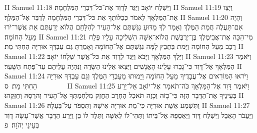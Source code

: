 II Samuel 11:18	וַיִּשְׁלַח יוֹאָב וַיַּגֵּד לְדָוִד אֶת־כּל־דִּבְרֵי הַמִּלְחָמָה׃
II Samuel 11:19	וַיְצַו אֶת־הַמַּלְאָךְ לֵאמֹר כְּכַלּוֹתְךָ אֵת כּל־דִּבְרֵי הַמִּלְחָמָה לְדַבֵּר אֶל־הַמֶּלֶךְ׃
II Samuel 11:20	וְהָיָה אִם־תַּעֲלֶה חֲמַת הַמֶּלֶךְ וְאָמַר לְךָ מַדּוּעַ נִגַּשְׁתֶּם אֶל־הָעִיר לְהִלָּחֵם הֲלוֹא יְדַעְתֶּם אֵת אֲשֶׁר־יֹרוּ מֵעַל הַחוֹמָה׃
II Samuel 11:21	מִי־הִכָּה אֶת־אֲבִימֶלֶךְ בֶּן־יְרֻבֶּשֶׁת הֲלוֹא־אִשָּׁה הִשְׁלִיכָה עָלָיו פֶּלַח רֶכֶב מֵעַל הַחוֹמָה וַיָּמת בְּתֵבֵץ לָמָּה נִגַּשְׁתֶּם אֶל־הַחוֹמָה וְאָמַרְתָּ גַּם עַבְדְּךָ אוּרִיָּה הַחִתִּי מֵת׃
II Samuel 11:22	וַיֵּלֶךְ הַמַּלְאָךְ וַיָּבֹא וַיַּגֵּד לְדָוִד אֵת כּל־אֲשֶׁר שְׁלָחוֹ יוֹאָב׃
II Samuel 11:23	וַיֹּאמֶר הַמַּלְאָךְ אֶל־דָּוִד כִּי־גָבְרוּ עָלֵינוּ הָאֲנָשִׁים וַיֵּצְאוּ אֵלֵינוּ הַשָּׂדֶה וַנִּהְיֶה עֲלֵיהֶם עַד־פֶּתַח הַשָּׁעַר׃
II Samuel 11:24	וַיֹּראוּ הַמּוֹרִאים אֶל־עֲבָדֶיךָ מֵעַל הַחוֹמָה וַיָּמוּתוּ מֵעַבְדֵי הַמֶּלֶךְ וְגַם עַבְדְּךָ אוּרִיָּה הַחִתִּי מֵת׃ {ס}        
II Samuel 11:25	וַיֹּאמֶר דָּוִד אֶל־הַמַּלְאָךְ כֹּה־תֹאמַר אֶל־יוֹאָב אַל־יֵרַע בְּעֵינֶיךָ אֶת־הַדָּבָר הַזֶּה כִּי־כָזֹה וְכָזֶה תֹּאכַל הֶחָרֶב הַחֲזֵק מִלְחַמְתְּךָ אֶל־הָעִיר וְהרְסָהּ וְחַזְּקֵהוּ׃
II Samuel 11:26	וַתִּשְׁמַע אֵשֶׁת אוּרִיָּה כִּי־מֵת אוּרִיָּה אִישָׁהּ וַתִּסְפֹּד עַל־בַּעְלָהּ׃
II Samuel 11:27	וַיַּעֲבֹר הָאֵבֶל וַיִּשְׁלַח דָּוִד וַיַּאַסְפָהּ אֶל־בֵּיתוֹ וַתְּהִי־לוֹ לְאִשָּׁה וַתֵּלֶד לוֹ בֵּן וַיֵּרַע הַדָּבָר אֲשֶׁר־עָשָׂה דָוִד בְּעֵינֵי יְהֹוָה׃ {פ}
